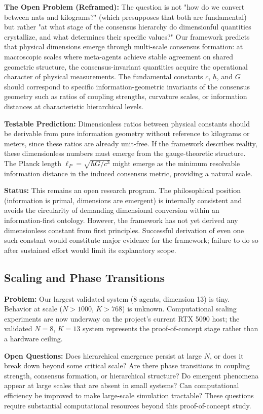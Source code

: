 \documentclass[11pt]{article}
\begin{document}
\textbf{The Open Problem (Reframed):} The question is not "how do we convert between nats and kilograms?" (which presupposes that both are fundamental) but rather "at what stage of the consensus hierarchy do dimensionful quantities crystallize, and what determines their specific values?" Our framework predicts that physical dimensions emerge through multi-scale consensus formation: at macroscopic scales where meta-agents achieve stable agreement on shared geometric structure, the consensus-invariant quantities acquire the operational character of physical measurements. The fundamental constants $c$, $\hbar$, and $G$ should correspond to specific information-geometric invariants of the consensus geometry such as ratios of coupling strengths, curvature scales, or information distances at characteristic hierarchical levels.

\textbf{Testable Prediction:} Dimensionless ratios between physical constants should be derivable from pure information geometry without reference to kilograms or meters, since these ratios are already unit-free. If the framework describes reality, these dimensionless numbers must emerge from the gauge-theoretic structure. The Planck length $\ell_P = \sqrt{\hbar G/c^3}$ might emerge as the minimum resolvable information distance in the induced consensus metric, providing a natural scale.

\textbf{Status:} This remains an open research program. The philosophical position (information is primal, dimensions are emergent) is internally consistent and avoids the circularity of demanding dimensional conversion within an information-first ontology. However, the framework has not yet derived any dimensionless constant from first principles. Successful derivation of even one such constant would constitute major evidence for the framework; failure to do so after sustained effort would limit its explanatory scope.

\subsection{Scaling and Phase Transitions}

\textbf{Problem:} Our largest validated system (8 agents, dimension 13) is tiny. Behavior at scale ($N>1000$, $K>768$) is unknown. Computational scaling experiments are now underway on the project's current RTX 5090 host; the validated $N{=}8$, $K{=}13$ system represents the proof-of-concept stage rather than a hardware ceiling.

\textbf{Open Questions:} Does hierarchical emergence persist at large $N$, or does it break down beyond some critical scale? Are there phase transitions in coupling strength, consensus formation, or hierarchical structure? Do emergent phenomena appear at large scales that are absent in small systems? Can computational efficiency be improved to make large-scale simulation tractable? These questions require substantial computational resources beyond this proof-of-concept study.
\end{document}
